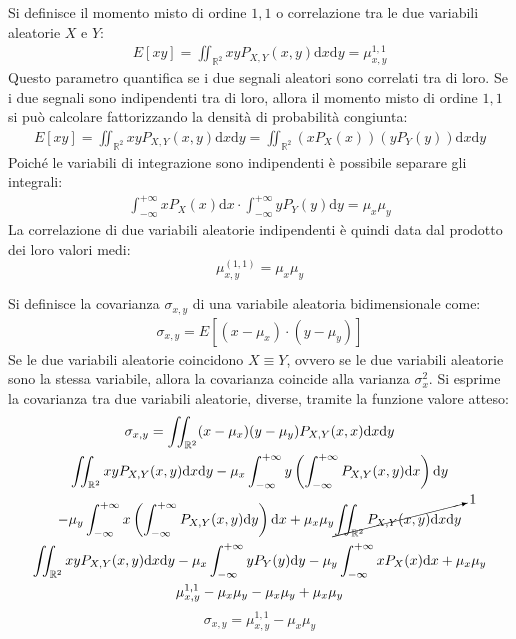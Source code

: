 \documentclass{article}
\newcommand{\df}{\mathrm{d}}
\numberwithin{equation}{subsection}
\begin{document}
Si definisce il momento misto di ordine $1,1$ o correlazione tra le due variabili aleatorie $X$ e $Y$:
\begin{gather}
    E[xy]=\displaystyle\iint_{\mathbb{R}^2}xyP_{X,Y}(x,y)\df x\df y=\mu_{x,y}^{1,1}
\end{gather}
Questo parametro quantifica se i due segnali aleatori sono correlati tra di loro. Se i due segnali sono indipendenti tra di loro, allora il momento misto di ordine $1,1$ si 
può calcolare fattorizzando la densità di probabilità congiunta:
\begin{gather*}
    E[xy]=\displaystyle\iint_{\mathbb{R}^2}xyP_{X,Y}(x,y)\df x\df y=\iint_{\mathbb{R}^2}(xP_X(x))(yP_Y(y))\df x\df y
\end{gather*}
Poiché le variabili di integrazione sono indipendenti è possibile separare gli integrali:
\begin{gather*}
    \displaystyle\int_{-\infty}^{+\infty}xP_X(x)\df x\cdot\int_{-\infty}^{+\infty}yP_Y(y)\df y=\mu_x\mu_y
\end{gather*}
La correlazione di due variabili aleatorie indipendenti è quindi data dal prodotto dei loro valori medi:
\begin{equation}
    \mu_{x,y}^{(1,1)}=\mu_x\mu_y
\end{equation}


Si definisce la covarianza $\sigma_{x,y}$ di una variabile aleatoria bidimensionale come:
\begin{gather*}
    \sigma_{x,y}=E[(x-\mu_x)\cdot(y-\mu_y)]
\end{gather*}
Se le due variabili aleatorie coincidono $X\equiv Y$, ovvero se le due variabili aleatorie sono la stessa variabile, allora la covarianza coincide alla varianza $\sigma_x^2$. 
Si esprime la covarianza tra due variabili aleatorie, diverse, tramite la funzione valore atteso:
\begin{gather*}
    \sigma_{x,y}=\iint_{\mathbb{R}^2}(x-\mu_x)(y-\mu_y)P_{X,Y}(x,x)\df x\df y\\
    \displaystyle\iint_{\mathbb{R}^2}xyP_{X,Y}(x,y)\df x\df y-\mu_x\int_{-\infty}^{+\infty}y\left(\int_{-\infty}^{+\infty}P_{X,Y}(x,y)\df x\right)\df y\\
    -\displaystyle\mu_y\int_{-\infty}^{+\infty}x\left(\int_{-\infty}^{+\infty}P_{X,Y}(x,y)\df y\right)\df x+\mu_x\mu_y\cancelto{1}{\iint_{\mathbb{R}^2}P_{X,Y}(x,y)\df x\df y}\\
    \displaystyle\iint_{\mathbb{R}^2}xyP_{X,Y}(x,y)\df x\df y-\mu_x\int_{-\infty}^{+\infty}yP_Y(y)\df y-\mu_y\int_{-\infty}^{+\infty}xP_X(x)\df x+\mu_x\mu_y\\
    \mu_{x,y}^{1,1}-\mu_x\mu_y-\mu_x\mu_y+\mu_x\mu_y
\end{gather*}
\begin{equation}
    \sigma_{x,y}=\mu_{x,y}^{1,1}-\mu_x\mu_y
\end{equation}
\end{document}
